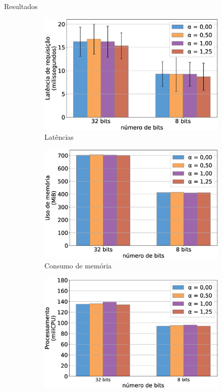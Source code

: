 \begin{frame}{Resultados}
    \begin{figure}[H]
        \centering
        \begin{subfigure}[b]{0.32\textwidth}
            \includegraphics[width=\textwidth]{figuras/latencia3.eps}
            \caption{\scriptsize{Latências}}
          \end{subfigure}  
          \begin{subfigure}[b]{0.32\textwidth}
            \includegraphics[width=\textwidth]{figuras/memoria3.eps}
            \caption{\scriptsize{Consumo de memória}}
        \end{subfigure}
        \begin{subfigure}[b]{0.32\textwidth}
            \includegraphics[width=\textwidth]{figuras/cpu3.eps}

\end{subfigure}
\end{figure}
\end{frame}
